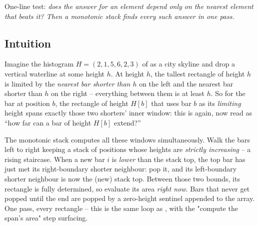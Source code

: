 \begin{recognitionbox}
One-line test: \emph{does the answer for an element depend only on the nearest element that beats it?
Then a monotonic stack finds every such answer in one pass.}
\end{recognitionbox}

\subsection{Intuition}

Imagine the histogram $H=(2,1,5,6,2,3)$ of  as a city skyline and drop a vertical
waterline at some height $h$. At height $h$, the tallest rectangle of height $h$ is limited by the
\emph{nearest bar shorter than $h$} on the left and the nearest bar shorter than $h$ on the right --
everything between them is at least $h$. So for the bar at position $b$, the rectangle of height
$H[b]$ that uses bar $b$ as its \emph{limiting} height spans exactly those two shorters' inner window:
this is  again, now read as ``how far can a bar of height $H[b]$ extend?''

The monotonic stack computes all these windows simultaneously. Walk the bars left to right keeping a
stack of positions whose heights are \emph{strictly increasing} -- a rising staircase. When a new bar
$i$ is \emph{lower} than the stack top, the top bar has just met its right-boundary shorter neighbour:
pop it, and its left-boundary shorter neighbour is now the (new) stack top. Between those two bounds,
its rectangle is fully determined, so evaluate its area \emph{right now}. Bars that never get popped
until the end are popped by a zero-height sentinel appended to the array. One pass, every rectangle --
this is the same loop as , with the "compute the span's area" step surfacing.


